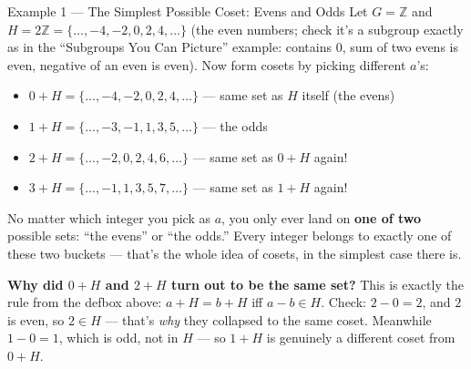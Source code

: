 \begin{exbox}{Example 1 --- The Simplest Possible Coset: Evens and Odds}
Let $G = \mathbb{Z}$ and $H = 2\mathbb{Z} = \{\ldots,-4,-2,0,2,4,\ldots\}$ (the even numbers; check it's a subgroup exactly as in the ``Subgroups You Can Picture'' example: contains $0$, sum of two evens is even, negative of an even is even). Now form cosets by picking different $a$'s:
\begin{itemize}[leftmargin=*]
  \item $0 + H = \{\ldots,-4,-2,0,2,4,\ldots\}$ --- same set as $H$ itself (the evens)
  \item $1 + H = \{\ldots,-3,-1,1,3,5,\ldots\}$ --- the odds
  \item $2 + H = \{\ldots,-2,0,2,4,6,\ldots\}$ --- same set as $0+H$ again!
  \item $3 + H = \{\ldots,-1,1,3,5,7,\ldots\}$ --- same set as $1+H$ again!
\end{itemize}
No matter which integer you pick as $a$, you only ever land on \textbf{one of two} possible sets: ``the evens'' or ``the odds.'' Every integer belongs to exactly one of these two buckets --- that's the whole idea of cosets, in the simplest case there is.

\textbf{Why did $0+H$ and $2+H$ turn out to be the same set?} This is exactly the rule from the defbox above: $a+H=b+H$ iff $a-b\in H$. Check: $2-0=2$, and $2$ is even, so $2\in H$ --- that's \emph{why} they collapsed to the same coset. Meanwhile $1-0=1$, which is odd, not in $H$ --- so $1+H$ is genuinely a different coset from $0+H$.
\end{exbox}

